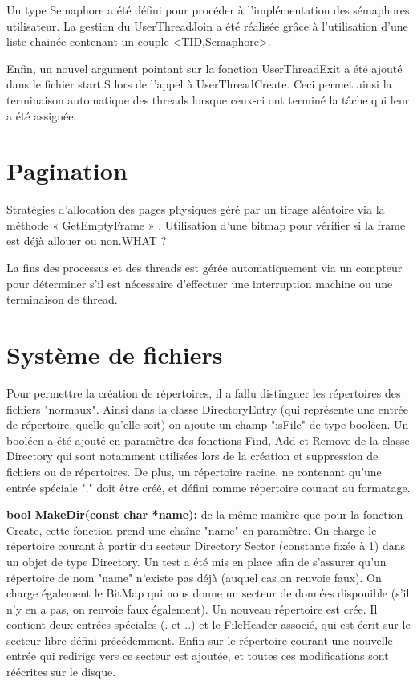 \documentclass[12pt]{report}
\begin{document}
Un type Semaphore a été défini pour procéder à l'implémentation des sémaphores utilisateur. 
La gestion du UserThreadJoin a été réalisée grâce à l'utilisation d'une liste chainée contenant un couple <TID,Semaphore>.

Enfin, un nouvel argument pointant sur la fonction UserThreadExit a été ajouté dans le fichier start.S lors de l'appel à UserThreadCreate. Ceci permet ainsi la terminaison automatique des threads lorsque ceux-ci ont terminé la tâche qui leur a été assignée.



\section{Pagination}


Stratégies d’allocation des pages physiques géré par un tirage aléatoire via la méthode « GetEmptyFrame » . Utilisation d’une bitmap pour vérifier si la frame est déjà allouer ou non.\color{red}WHAT ?\color{black}

La fins des processus et des threads est gérée automatiquement via un compteur pour déterminer s'il est nécessaire d'effectuer une interruption machine ou une terminaison de thread.

\section{Système de fichiers}

Pour permettre la création de répertoires, il a fallu distinguer les répertoires des fichiers "normaux". Ainsi dans la classe DirectoryEntry (qui représente une entrée de répertoire, quelle qu'elle soit) on ajoute un champ "isFile" de type booléen. Un booléen a été ajouté en paramètre des fonctions Find, Add et Remove de la classe Directory qui sont notamment utilisées lors de la création et suppression de fichiers ou de répertoires.
De plus, un répertoire racine, ne contenant qu'une entrée spéciale "." doit être créé, et défini comme répertoire courant au formatage.

\textbf{bool MakeDir(const char *name):} de la même manière que pour la fonction Create, cette fonction prend une chaîne "name" en paramètre. On charge le répertoire courant à partir du secteur Directory	Sector (constante fixée à 1) dans un objet de type Directory. Un test a été mis en place afin de  s'assurer qu'un répertoire de nom "name" n'existe pas déjà (auquel cas on renvoie faux). On charge également le BitMap qui nous donne un secteur de données disponible (s'il n'y en a pas, on renvoie faux également). 
Un nouveau répertoire est crée. Il contient deux entrées spéciales (. et ..) et le FileHeader associé, qui est écrit sur le secteur libre défini précédemment. Enfin sur le répertoire courant une nouvelle entrée qui redirige vers ce secteur est ajoutée, et toutes ces modifications sont réécrites sur le disque.
\bigskip
\end{document}
